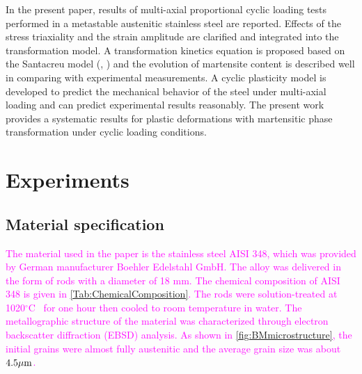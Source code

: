 \documentclass[preprint,5p,twocolumn,10pt,sort&compress]{elsarticle}
\newcommand{\degreeC}{{$^\circ$C}}
\newcommand{\jingyu}[1]{\textcolor{magenta}{#1}}
\begin{document}
In the present paper, results of multi-axial proportional cyclic loading tests performed in a metastable austenitic stainless steel are reported. Effects of the stress triaxiality and the strain amplitude are clarified  and integrated into the transformation model. A transformation kinetics equation is proposed based on the Santacreu model (\citeauthor{Santacreu2006Behaviour}, \citeyear{Santacreu2006Behaviour}) and the evolution of martensite content is described well in comparing with experimental measurements. A cyclic plasticity model is developed to predict the mechanical behavior of the steel under multi-axial loading and can predict experimental results reasonably. The present work provides a systematic results for plastic deformations with martensitic phase transformation under cyclic loading conditions.


\section{Experiments}

\subsection{Material specification}

\jingyu{The material used in the paper is the stainless steel AISI 348, which was provided by German manufacturer Boehler Edelstahl GmbH. The alloy was delivered in the form of rods with a diameter of 18 mm. The chemical composition of AISI 348 is given in \autoref{Tab:ChemicalComposition}. The rods were solution-treated at 1020\degreeC~ for one hour then cooled to room temperature in water. The metallographic structure of the material was characterized through electron backscatter diffraction (EBSD) analysis. As shown in \autoref{fig:BMmicrostructure}, the initial grains were almost fully austenitic and the average grain size was about $4.5 \rm{\mu m}$.}


\end{document}
